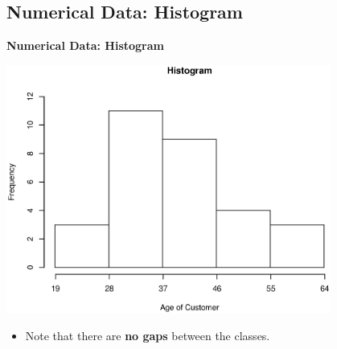 \documentclass[compress]{beamer}        %
\makeatletter
\newcommand{\tcb}{\textcolor{beamer@blendedblue}}
\makeatother
\begin{document}
\subsection{Numerical Data: Histogram}
\begin{frame}{\bf \tcb{Numerical Data: Histogram}\\[-1.2cm]}
\begin{center}
\includegraphics[width=0.8\textwidth, trim = 0.0cm 0.5cm 0.3cm 1.4cm, clip]{Ages}
\end{center}
\begin{itemize}\itemsep0.2cm
\item Note that there are {\bf no gaps} between the classes. 
\end{itemize}
\end{frame}
\end{document}
